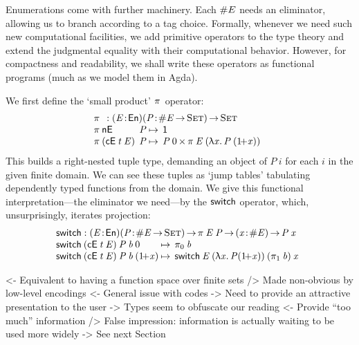 Enumerations come with further machinery. Each \(\EnumT{E}\) needs an
eliminator, allowing us to branch according to a tag choice. Formally,
whenever we need such new computational facilities, we add primitive
operators to the type theory and extend the judgmental equality with
their computational behavior. However, for compactness and readability, we
shall write these operators as functional programs (much as we
model them in Agda).

We first define the `small product' $\spi{\!}{\!}$ operator:
%
\[\stk{
\spi{}{}: \PITEL{\V{E}}{\EnumU}\PITEL{\V{P}}{\EnumT{\V{E}} \To \Set} \To \Set \\
\begin{array}{@{}l@{\:}l@{\:\mapsto\:\:}l}
\spi{\NilE}{& \V{P}}        & \Unit \\
\spi{(\ConsE{\V{t}}{\V{E}})}{& \V{P}} & \TIMES{\V{P}\: \Ze}{\spi{\V{E}}{(\LAM{\V{x}} \V{P}\: (\Su{\V{x}}))}}
\end{array}
}\]
%
This builds a right-nested
tuple type, demanding an object of $P\:i$ for each $i$ in the given finite
domain. We can see these tuples as `jump tables' tabulating dependently
typed functions from the domain. We give this functional
interpretation---the eliminator we need---by the
$\F{switch}$ operator, which, unsurprisingly, iterates projection:
%
\[\stk{
\begin{array}{@{}ll}
\F{switch} : \PITEL{\V{E}}{\EnumU}
               \PITEL{\V{P}}{\EnumT{\V{E}} \To \Set} \To
              \spi{\V{E}}{\V{P}} \To
               \PITEL{\V{x}}{\EnumT{\V{E}}} \To \V{P}\: \x
\end{array} \\
\begin{array}{@{}l@{\:\mapsto\:\:}l}
\switch{(\ConsE{\V{t}}{\V{E}})}{\V{P}}{\V{b}}{\Ze}      & \fst{\V{b}} \\
\switch{(\ConsE{\V{t}}{\V{E}})}{\V{P}}{\V{b}}{(\Su{\V{x}})} & \switch{\V{E}}{(\LAM{\V{x}} \V{P}
  (\Su{\V{x}}))}{(\snd{\V{b}})}{\V{x}}
\end{array}
}\]


\begin{wstructure}
<- Equivalent to having a function space over finite sets
    /> Made non-obvious by low-level encodings
        <- General issue with codes
             -> Need to provide an attractive presentation to the user
    -> Types seem to obfuscate our reading
        <- Provide ``too much'' information
        /> False impression: information is actually waiting to be used more widely
        -> See next Section
\end{wstructure}

